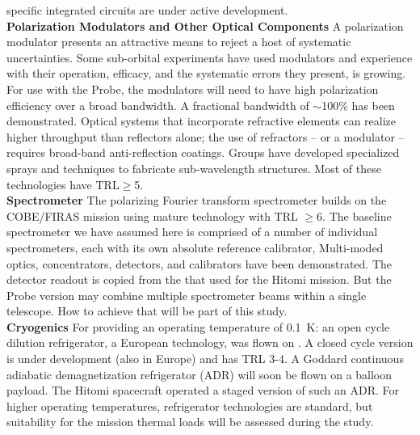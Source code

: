 specific integrated circuits are under active development.  \\
{\bf Polarization Modulators and Other Optical Components}  \hspace{0.1in} A polarization modulator presents 
an attractive means to reject a host of systematic uncertainties. Some sub-orbital experiments have used modulators 
and experience with their operation, efficacy, and the systematic errors they present, is growing. For use with the Probe,
the modulators will need to have high polarization efficiency over a broad bandwidth.  A fractional bandwidth of $\sim$100\%  
has been demonstrated. Optical systems that incorporate refractive elements can realize higher throughput 
than reflectors alone; the use of refractors -- or a modulator -- requires broad-band anti-reflection coatings. Groups 
have developed specialized sprays and techniques to fabricate sub-wavelength structures. Most of these 
technologies have TRL$\geq$5.  \\
{\bf Spectrometer} \hspace{0.1in} 
The polarizing Fourier transform spectrometer builds on the COBE/FIRAS mission using mature technology with TRL $\geq$6. 
The baseline spectrometer we have assumed here 
is comprised of a number of individual spectrometers, each with its own absolute reference calibrator, 
Multi-moded optics, concentrators, detectors, and calibrators have been demonstrated. The detector readout is copied from the 
that used for the Hitomi mission. But the Probe version may combine multiple spectrometer beams within a single telescope. 
How to achieve that will be part of this study. \\
{\bf Cryogenics }  \hspace{0.1in} For providing an operating temperature of 0.1~K: an open cycle dilution 
refrigerator, a European technology, was flown on \planck . 
A closed cycle version is under development (also in Europe) and has TRL 3-4. A Goddard continuous adiabatic 
demagnetization refrigerator (ADR) will soon be flown on a balloon payload.  The Hitomi spacecraft operated a 
staged version of such an ADR. For higher operating temperatures, refrigerator technologies are standard, but 
suitability for the mission thermal loads will be assessed during the study. 



